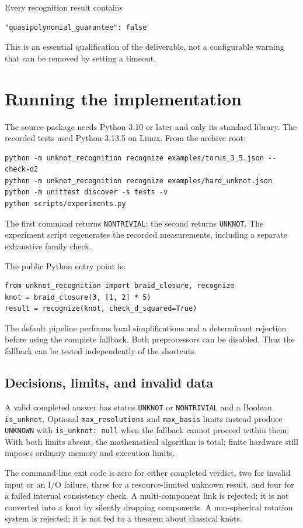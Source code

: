 \documentclass[11pt]{article}
\theoremstyle{definition}
\newcommand{\code}[1]{\texttt{#1}}
\begin{document}
Every recognition result contains
\begin{verbatim}
"quasipolynomial_guarantee": false
\end{verbatim}
This is an essential qualification of the deliverable, not a configurable
warning that can be removed by setting a timeout.

\section{Running the implementation}

The source package needs Python 3.10 or later and only its standard library.
The recorded tests used Python 3.13.5 on Linux. From the archive root:
\begin{verbatim}
python -m unknot_recognition recognize examples/torus_3_5.json --check-d2
python -m unknot_recognition recognize examples/hard_unknot.json
python -m unittest discover -s tests -v
python scripts/experiments.py
\end{verbatim}
The first command returns \code{NONTRIVIAL}; the second returns \code{UNKNOT}.
The experiment script regenerates the recorded measurements, including a
separate exhaustive family check.

The public Python entry point is:
\begin{verbatim}
from unknot_recognition import braid_closure, recognize
knot = braid_closure(3, [1, 2] * 5)
result = recognize(knot, check_d_squared=True)
\end{verbatim}
The default pipeline performs local simplifications and a determinant rejection
before using the complete fallback. Both preprocessors can be disabled. Thus
the fallback can be tested independently of the shortcuts.

\subsection{Decisions, limits, and invalid data}

A valid completed answer has status \code{UNKNOT} or \code{NONTRIVIAL} and a
Boolean \code{is\_unknot}. Optional \code{max\_resolutions} and
\code{max\_basis} limits instead produce \code{UNKNOWN} with
\code{is\_unknot: null} when the fallback cannot proceed within them. With both
limits absent, the mathematical algorithm is total; finite hardware still
imposes ordinary memory and execution limits.

The command-line exit code is zero for either completed verdict, two for invalid
input or an I/O failure, three for a resource-limited unknown result, and four
for a failed internal consistency check. A multi-component link is rejected; it
is not converted into a knot by silently dropping components. A non-spherical
rotation system is rejected; it is not fed to a theorem about classical knots.
\end{document}
